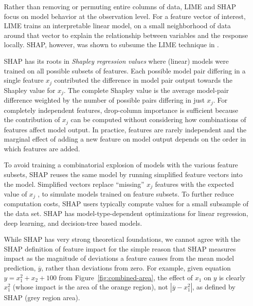 \documentclass[11pt]{article}
\newcommand{\figref}[1]{Figure~\ref{#1}}
\newcommand{\todo}[1]{{{\color{red}{[#1]}}}}
\begin{document}
Rather than removing or permuting entire columns of data, LIME \citep{lime} and SHAP \citep{shap} focus on model behavior at the observation level. For a feature vector of interest, LIME trains an interpretable linear model, on a small neighborhood of data around that vector to explain the relationship between variables and the response locally. SHAP, however, was shown to subsume the LIME technique in \citep{shap}.

SHAP has its roots in {\em Shapley regression values} \citep{shapley-regression} where (linear) models were trained on all possible subsets of features.  Each possible model pair differing in a single feature $x_j$ contributed the difference in model pair output towards the Shapley value for $x_j$. The complete Shapley value is the average model-pair difference weighted by the number of possible pairs differing in just $x_j$.  For completely independent features, drop-column importance is sufficient because the contribution of $x_j$ can be computed without considering how combinations of features affect model output.  In practice, features are rarely independent and the marginal effect of adding a new feature on model output depends on the order in which features are added.  

To avoid training a combinatorial explosion of models with the various feature subsets, SHAP reuses the same model by running simplified feature vectors into the model. Simplified vectors replace ``missing'' $x_j$ features with the expected value of $x_j$ \todo{isn't it $E[f(z)]$? hold on, they are approximating $f(z_S)$ not missing $x_j$ features; another description indicates that you replace missing values with a random one selected from other records}, to simulate models trained on feature subsets. To further reduce computation costs, SHAP users typically compute values for a small subsample of the data set. SHAP has model-type-dependent optimizations for linear regression, deep learning, and decision-tree based models. 

While SHAP has very strong theoretical foundations, we cannot agree with the SHAP definition of feature impact for the simple reason that SHAP measures impact as the magnitude of deviations a feature causes from the mean model prediction, $\overline{y}$, rather than deviations from zero.   For example, given equation $y=x_1^2 + x_2 + 100$ from \figref{fig:combined-area}, the effect of $x_1$ on $y$ is clearly $x_1^2$ (whose impact is the area of the orange region), not $|\overline{y} - x_1^2|$, as defined by SHAP (grey region area).  \todo{need to explain why they are wrong or is it obvious?} 
\end{document}
